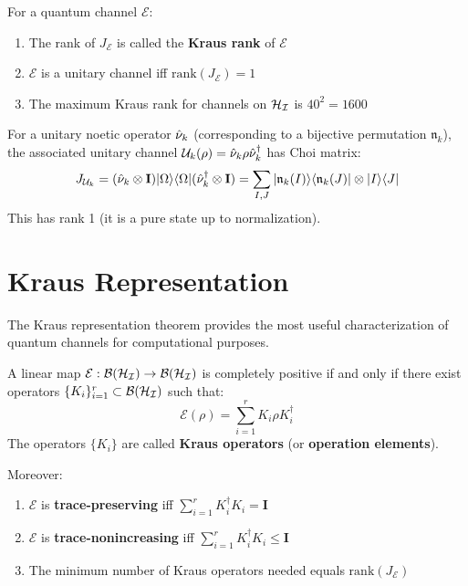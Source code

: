 \begin{corollary}
\label{cor:choi-rank}
For a quantum channel $\mathcal{E}$:
\begin{enumerate}
  \item The rank of $J_{\mathcal{E}}$ is called the \textbf{Kraus rank} of $\mathcal{E}$
  \item $\mathcal{E}$ is a unitary channel iff $\mathrm{rank}(J_{\mathcal{E}}) = 1$
  \item The maximum Kraus rank for channels on $\mathcal{H}_{\mathcal{I}}$ is $40^2 = 1600$
\end{enumerate}
\end{corollary}

\begin{definition}
\label{def:choi-noetic}
For a unitary noetic operator $\hat{\nu}_k$ (corresponding to a bijective permutation $\mathfrak{n}_k$), the associated unitary channel $\mathcal{U}_k(\rho) = \hat{\nu}_k \rho \hat{\nu}_k^\dagger$ has Choi matrix:
\[
J_{\mathcal{U}_k} = (\hat{\nu}_k \otimes \mathbf{I}) |\Omega\rangle\langle \Omega| (\hat{\nu}_k^\dagger \otimes \mathbf{I}) = \sum_{I,J} |\mathfrak{n}_k(I)\rangle\langle \mathfrak{n}_k(J)| \otimes |I\rangle\langle J|
\]
This has rank 1 (it is a pure state up to normalization).
\end{definition}

\section{Kraus Representation}
\label{sec:kraus-representation}

The Kraus representation theorem provides the most useful characterization of quantum channels for computational purposes.

\begin{theorem}
\label{thm:kraus}
A linear map $\mathcal{E} : \mathcal{B}(\mathcal{H}_{\mathcal{I}}) \to \mathcal{B}(\mathcal{H}_{\mathcal{I}})$ is completely positive if and only if there exist operators $\{K_i\}_{i=1}^{r} \subset \mathcal{B}(\mathcal{H}_{\mathcal{I}})$ such that:
\[
\mathcal{E}(\rho) = \sum_{i=1}^{r} K_i \rho K_i^\dagger
\]
The operators $\{K_i\}$ are called \textbf{Kraus operators} (or \textbf{operation elements}).

Moreover:
\begin{enumerate}
  \item $\mathcal{E}$ is \textbf{trace-preserving} iff $\sum_{i=1}^{r} K_i^\dagger K_i = \mathbf{I}$
  \item $\mathcal{E}$ is \textbf{trace-nonincreasing} iff $\sum_{i=1}^{r} K_i^\dagger K_i \leq \mathbf{I}$
  \item The minimum number of Kraus operators needed equals $\mathrm{rank}(J_{\mathcal{E}})$
\end{enumerate}
\end{theorem}


